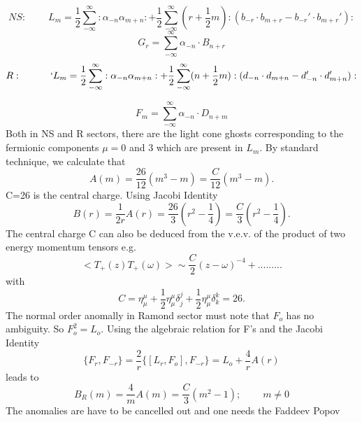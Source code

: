 \documentclass[a4paper,showpacs,preprintnumbers,amsmath,amssymb]{revtex4}
\begin{document}
\begin{equation}
NS:~~~~~~~~~~L_m = \frac{1}{2}\sum^{\infty}_{-\infty}:\alpha_{-n}\alpha_{m+n}: 
+ \frac{1}{2} \sum^{\infty}_{-\infty}(r+\frac{1}{2}m): (b_{-r} 
\cdot b_{m+r} - b_{-r}' \cdot b_{m+r}'): 
\end{equation}
\begin{equation}
G_r= \sum^{\infty}_{-\infty}\alpha_{-n}\cdot B_{n+r}
\end{equation}
\begin{equation}
R:~~~~~~~~~`L_m = \frac{1}{2}\sum^{\infty}_{-\infty}:\alpha_{-n}\alpha_{m+n}: 
+ \frac{1}{2} \sum^{\infty}_{-\infty}(n+\frac{1}{2}m): (d_{-n} \cdot d_{m+n} - d_{-n}' 
\cdot d_{m+n}'):
\end{equation}

\begin{equation}
F_m= \sum^{\infty}_{-\infty}\alpha_{-n}\cdot D_{n+m}
\end{equation}
Both in NS and R sectors, there are the light cone ghosts corresponding to the 
fermionic components $\mu =0$ and 3 which are present in $L_m$.
By standard technique, we calculate that
\begin{equation}
A(m)=\frac{26}{12}(m^3-m)=\frac{C}{12}(m^3-m).
\end{equation}
C=26 is the central charge. Using Jacobi Identity
\begin{equation}
B(r)=\frac{1}{2r}A(r)=\frac{26}{3}(r^2-\frac{1}{4})=\frac{C}{3}(r^2-\frac{1}{4}).
\end{equation}
The central charge C can also be deduced from the v.e.v. of the product of two energy
momentum tensors e.g.
\begin{equation}
< T_+(z)T_+(\omega)>\sim \frac{C}{2}(z-\omega)^{-4}+.........
\end{equation}
with
\begin{equation}
C=\eta^{\mu}_{\mu}+\frac{1}{2}\eta^{\mu}_{\mu}\delta^j_j +
\frac{1}{2}\eta^{\mu}_{\mu}\delta^k_k=26.
\end{equation} 
The normal order anomally in Ramond sector must note that $F_o$ has no ambiguity. 
So $F_o^2 =L_o$. Using the algebraic relation for F's and the Jacobi Identity
\begin{equation}
\{ F_r , F_{-r}\} = \frac{2}{r}\{ [L_r ,F_o], F_{-r}\} =L_o + \frac{4}{r} A(r)
\end{equation} 
leads to
\begin{equation}
 B_R(m)=\frac{4}{m} A(m)=\frac{C}{3}(m^2 - 1);~~~~~~~~~~ m\neq 0
\end{equation}
The anomalies are have to be cancelled out and one needs the Faddeev Popov
\end{document}
